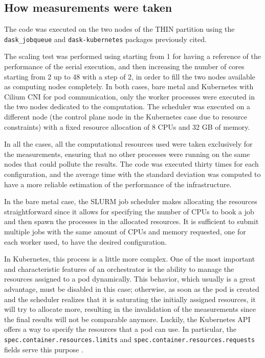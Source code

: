 \subsection{How measurements were taken}\label{subsec:benchmarkmeasuraments}

The code was executed on the two nodes of the THIN partition using the
\texttt{dask\_jobqueue} and \texttt{dask-kubernetes} packages previously cited.

The scaling test was performed using starting from 1 for having a reference of
the performance of the serial execution, and then increasing the number of cores
starting from 2 up to 48 with a step of 2, in order to fill the two nodes
available as computing nodes completely.
In both cases, bare metal and Kubernetes with Cilium CNI for pod communication,
only the worker processes were executed in the two nodes dedicated to the
computation. The scheduler was executed on a different node (the control plane
node in the Kubernetes case due to resource constraints) with a fixed resource
allocation of 8 CPUs and 32 GB of memory.

In all the cases, all the computational resources used were taken exclusively
for the measurements, ensuring that no other processes were running on the same
nodes that could pollute the results.
The code was executed thirty times for each configuration, and the average time
with the standard deviation was computed to have a more reliable estimation of
the performance of the infrastructure.

In the bare metal case, the SLURM job scheduler makes allocating the resources
straightforward since it allows for specifying the number of CPUs to book a job
and then spawn the processes in the allocated resources.
It is sufficient to submit multiple jobs with the same amount of CPUs and
memory requested, one for each worker used, to have the desired configuration.

In Kubernetes, this process is a little more complex. One of the most important
and characteristic features of an orchestrator is the ability to manage the
resources assigned to a pod dynamically.
This behavior, which usually is a great advantage, must be disabled in this
case; otherwise, as soon as the pod is created and the scheduler realizes that
it is saturating the initially assigned resources, it will try to allocate more,
resulting in the invalidation of the measurements since the final results will
not be comparable anymore.
Luckily, the Kubernetes API offers a way to specify the resources that a pod can
use. In particular, the \texttt{spec.container.resources.limits} and
\texttt{spec.container.resources.requests} fields serve this purpose
\cite{kdoc-resources}.

